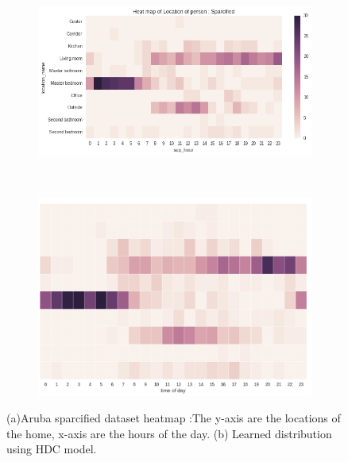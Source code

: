 \begin{figure}
    \centering
    \begin{subfigure}[b]{0.55\textwidth}
    \includegraphics[width=\textwidth]{images/aruba-reduced-heatmap.png}

    \caption{}
        \label{aruba_sparse}
    \end{subfigure}
    ~ %
    \begin{subfigure}[b]{0.4\textwidth}
    \includegraphics[width=\textwidth]{images/learned-aruba.png}
        \caption{}
        \label{fig:learned_aruba}
    \end{subfigure}
    \caption[Aruba sparcified dataset vs learned model  heatmap]{(a)Aruba sparcified dataset heatmap :The y-axis are the locations of the home, x-axis are the hours of the day. (b) Learned distribution using HDC model.} 
\label{aruba-reduced-hist}
\end{figure}

